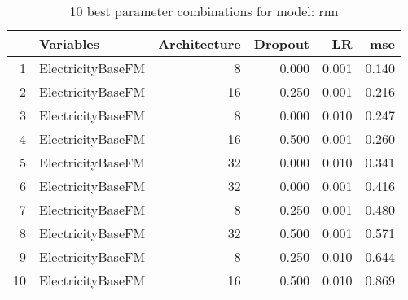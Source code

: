 \begin{table}[ht]
\centering
\begin{tabular}{rlrrrr}
  \hline
 & Variables & Architecture & Dropout & LR & mse \\ 
  \hline
1 & ElectricityBaseFM &    8 & 0.000 & 0.001 & 0.140 \\ 
  2 & ElectricityBaseFM &   16 & 0.250 & 0.001 & 0.216 \\ 
  3 & ElectricityBaseFM &    8 & 0.000 & 0.010 & 0.247 \\ 
  4 & ElectricityBaseFM &   16 & 0.500 & 0.001 & 0.260 \\ 
  5 & ElectricityBaseFM &   32 & 0.000 & 0.010 & 0.341 \\ 
  6 & ElectricityBaseFM &   32 & 0.000 & 0.001 & 0.416 \\ 
  7 & ElectricityBaseFM &    8 & 0.250 & 0.001 & 0.480 \\ 
  8 & ElectricityBaseFM &   32 & 0.500 & 0.001 & 0.571 \\ 
  9 & ElectricityBaseFM &    8 & 0.250 & 0.010 & 0.644 \\ 
  10 & ElectricityBaseFM &   16 & 0.500 & 0.010 & 0.869 \\ 
   \hline
\end{tabular}
\caption{10 best parameter combinations for model: rnn} 
\label{tab:rnn_top_10}
\end{table}
